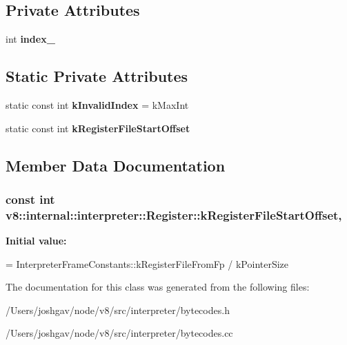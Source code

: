 \subsection*{Private Attributes}
\begin{DoxyCompactItemize}
\item 
int {\bfseries index\+\_\+}\hypertarget{classv8_1_1internal_1_1interpreter_1_1_register_abb74bfcb985f29e88577b13f85396cbd}{}\label{classv8_1_1internal_1_1interpreter_1_1_register_abb74bfcb985f29e88577b13f85396cbd}

\end{DoxyCompactItemize}
\subsection*{Static Private Attributes}
\begin{DoxyCompactItemize}
\item 
static const int {\bfseries k\+Invalid\+Index} = k\+Max\+Int\hypertarget{classv8_1_1internal_1_1interpreter_1_1_register_a736d095b0dbf36ab3ae4f396c5502a29}{}\label{classv8_1_1internal_1_1interpreter_1_1_register_a736d095b0dbf36ab3ae4f396c5502a29}

\item 
static const int {\bfseries k\+Register\+File\+Start\+Offset}
\end{DoxyCompactItemize}


\subsection{Member Data Documentation}
\subsubsection[{\texorpdfstring{k\+Register\+File\+Start\+Offset}{kRegisterFileStartOffset}}]{\setlength{\rightskip}{0pt plus 5cm}const int v8\+::internal\+::interpreter\+::\+Register\+::k\+Register\+File\+Start\+Offset\hspace{0.3cm}{\ttfamily [static]}, {\ttfamily [private]}}\hypertarget{classv8_1_1internal_1_1interpreter_1_1_register_a38dd8b08558958ae7847f3cee5c7adc3}{}\label{classv8_1_1internal_1_1interpreter_1_1_register_a38dd8b08558958ae7847f3cee5c7adc3}
{\bfseries Initial value\+:}
\begin{DoxyCode}
=
      InterpreterFrameConstants::kRegisterFileFromFp / kPointerSize
\end{DoxyCode}


The documentation for this class was generated from the following files\+:\begin{DoxyCompactItemize}
\item 
/\+Users/joshgav/node/v8/src/interpreter/bytecodes.\+h\item 
/\+Users/joshgav/node/v8/src/interpreter/bytecodes.\+cc\end{DoxyCompactItemize}
